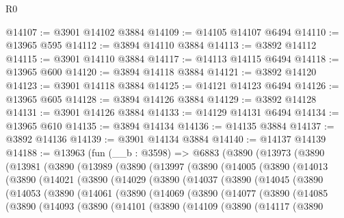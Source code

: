 \begin{lexlean}{R0}
\begin{coremodule}
@14107 := @3901 @14102 @3884
@14109 := @14105 @14107 @6494
@14110 := @13965 @595
@14112 := @3894 @14110 @3884
@14113 := @3892 @14112
@14115 := @3901 @14110 @3884
@14117 := @14113 @14115 @6494
@14118 := @13965 @600
@14120 := @3894 @14118 @3884
@14121 := @3892 @14120
@14123 := @3901 @14118 @3884
@14125 := @14121 @14123 @6494
@14126 := @13965 @605
@14128 := @3894 @14126 @3884
@14129 := @3892 @14128
@14131 := @3901 @14126 @3884
@14133 := @14129 @14131 @6494
@14134 := @13965 @610
@14135 := @3894 @14134
@14136 := @14135 @3884
@14137 := @3892 @14136
@14139 := @3901 @14134 @3884
@14140 := @14137 @14139
@14188 := @13963
    (fun (__b : @3598) =>
    @6883
      (@3890
        (@13973
          (@3890
            (@13981
              (@3890
                (@13989
                  (@3890
                    (@13997
                      (@3890
                        (@14005
                          (@3890
                            (@14013
                              (@3890
                                (@14021
                                  (@3890
                                    (@14029
                                      (@3890
                                        (@14037
                                          (@3890
                                            (@14045
                                              (@3890
                                                (@14053
                                                  (@3890
                                                    (@14061
                                                      (@3890
                                                        (@14069
                                                          (@3890
                                                            (@14077
                                                              (@3890
                                                                (@14085
                                                                  (@3890
                                                                    (@14093
                                                                      (@3890
                                                                        (@14101
                                                                          (@3890
                                                                            (@14109
                                                                              (@3890
                                                                                (@14117
                                                                                  (@3890

\end{coremodule}
\end{lexlean}
